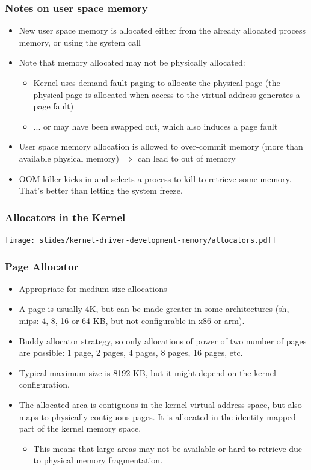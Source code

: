 \begin{frame}
  \frametitle{Notes on user space memory}
  \begin{itemize}
  \item New user space memory is allocated either from the already
    allocated process memory, or using the  system call
  \item Note that memory allocated may not be physically allocated:
    \begin{itemize}
    \item Kernel uses demand fault paging to allocate the physical
      page (the physical page is allocated when access to the virtual
      address generates a page fault)
    \item ... or may have been swapped out, which also induces a page
      fault
    \end{itemize}
  \item User space memory allocation is allowed to over-commit memory
    (more than available physical memory) $\Rightarrow$ can lead to
    out of memory
  \item OOM killer kicks in and selects a process to kill to retrieve
    some memory.  That's better than letting the system freeze.
  \end{itemize}
\end{frame}

\begin{frame}
  \frametitle{Allocators in the Kernel}
  \begin{center}
    \texttt{[image: slides/kernel-driver-development-memory/allocators.pdf]}
  \end{center}
\end{frame}

\begin{frame}
  \frametitle{Page Allocator}
  \begin{itemize}
  \item Appropriate for medium-size allocations
  \item A page is usually 4K, but can be made greater in some
    architectures (sh, mips: 4, 8, 16 or 64 KB, but not configurable in
    x86 or arm).
  \item Buddy allocator strategy, so only allocations of power of two
    number of pages are possible: 1 page, 2 pages, 4 pages, 8 pages,
    16 pages, etc.
  \item Typical maximum size is 8192 KB, but it might depend on the
    kernel configuration.
  \item The allocated area is contiguous in the kernel virtual address
    space, but also maps to physically contiguous pages. It is
    allocated in the identity-mapped part of the kernel memory space.
    \begin{itemize}
    \item This means that large areas may not be available or hard to
      retrieve due to physical memory fragmentation.
    \end{itemize}
  \end{itemize}
\end{frame}

